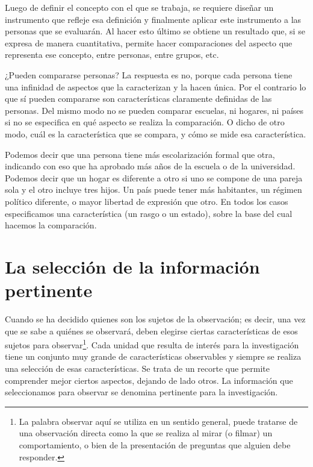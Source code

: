 \documentclass[]{book}
\let\rmarkdownfootnote\footnote%
\def\footnote{\protect\rmarkdownfootnote}
\begin{document}
Luego de definir el concepto con el que se trabaja, se requiere diseñar un instrumento que refleje esa definición y finalmente aplicar este instrumento a las personas que se evaluarán. Al hacer esto último se obtiene un resultado que, si se expresa de manera cuantitativa, permite hacer comparaciones del aspecto que representa ese concepto, entre personas, entre grupos, etc.

¿Pueden compararse personas? La respuesta es no, porque cada persona tiene una infinidad de aspectos que la caracterizan y la hacen única. Por el contrario lo que sí pueden compararse son características claramente definidas de las personas. Del mismo modo no se pueden comparar escuelas, ni hogares, ni países si no se especifica en qué aspecto se realiza la comparación. O dicho de otro modo, cuál es la característica que se compara, y cómo se mide esa característica.

Podemos decir que una persona tiene más escolarización formal que otra, indicando con eso que ha aprobado más años de la escuela o de la universidad. Podemos decir que un hogar es diferente a otro si uno se compone de una pareja sola y el otro incluye tres hijos. Un país puede tener más habitantes, un régimen político diferente, o mayor libertad de expresión que otro. En todos los casos especificamos una característica (un rasgo o un estado), sobre la base del cual hacemos la comparación.

\hypertarget{la-seleccion-de-la-informacion-pertinente}{%
\section{La selección de la información pertinente}\label{la-seleccion-de-la-informacion-pertinente}}

Cuando se ha decidido quienes son los sujetos de la observación; es decir, una vez que se sabe a quiénes se observará, deben elegirse ciertas características de esos sujetos para observar\footnote{La palabra observar aquí se utiliza en un sentido general, puede tratarse de una observación directa como la que se realiza al mirar (o filmar) un comportamiento, o bien de la presentación de preguntas que alguien debe responder.}. Cada unidad que resulta de interés para la investigación tiene un conjunto muy grande de características observables y siempre se realiza una selección de esas características. Se trata de un recorte que permite comprender mejor ciertos aspectos, dejando de lado otros. La información que seleccionamos para observar se denomina pertinente para la investigación.
\end{document}

